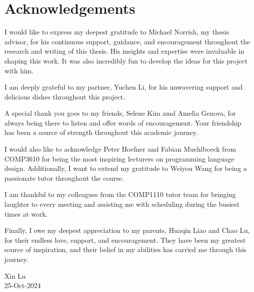 \chapter*{Acknowledgements}

I would like to express my deepest gratitude to Michael Norrish, 
my thesis advisor, for his continuous support, guidance, and encouragement 
throughout the research and writing of this thesis. His insights and expertise 
were invaluable in shaping this work. It was also incredibly fun to develop the ideas for
this project with him.

I am deeply grateful to my partner, Yuchen Li, for his unwavering support and delicious dishes 
throughout this project.

A special thank you goes to my friends, Selene Kim amd Amelia Genova, for always being there to listen and offer words of encouragement. 
Your friendship has been a source of strength throughout this academic journey.

I would also like to acknowledge Peter Hoefner and Fabian Muehlboeck from COMP3610 for being 
the most inspiring lecturers on programming language design. Additionally, I want to extend my 
gratitude to Weiyou Wang for being a passionate tutor throughout the course.

I am thankful to my colleagues from the COMP1110 tutor team for bringing laughter to every meeting 
and assisting me with scheduling during the busiest times at work.

Finally, I owe my deepest appreciation to my parents, Huaqin Liao and Chao Lu, for their endless love, support, and encouragement. They have been my greatest source of inspiration, and their belief in my abilities has carried me through this journey.

\bigskip

Xin Lu\\
25-Oct-2024
